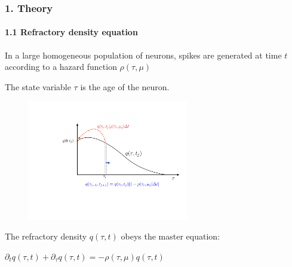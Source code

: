 \documentclass{beamer}
\begin{document}
\begin{frame}
\frametitle{1. Theory}
\framesubtitle{1.1 Refractory density equation}

In a large homogeneous population of neurons, spikes are generated at time $t$ according to a hazard function $\rho(\tau,\mu)$

\vspace{0.1cm}

The state variable $\tau$ is the age of the neuron.
 \begin{figure}
	\centering
	
	\includegraphics[width=70mm]{qtau}
	
\end{figure}


\pause
The refractory density $q(\tau,t)$ obeys the master equation:

\vspace{0.1cm}
\hspace{2.5cm}$
\partial_t q(\tau,t)+ \partial_\tau q(\tau,t)=-\rho(\tau,\mu)q(\tau,t)
$

\end{frame}
\end{document}
